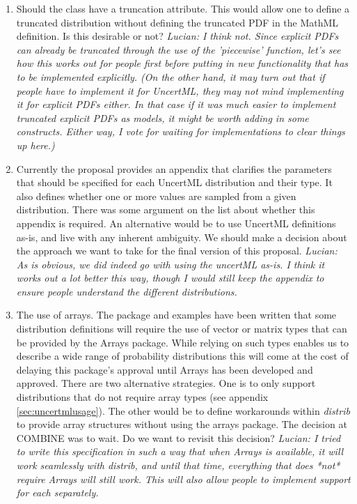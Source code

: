 \documentclass[draftspec]{sbmlpkgspec}
\newcommand{\distribshort}{\emph{distrib}\xspace}
\newcommand{\mathml}{MathML\xspace}
\newcommand{\uncertml}{UncertML\xspace}
\begin{document}
\begin{enumerate}
\item Should the  class have a truncation
  attribute. This would allow one to define a truncated distribution
  without defining the truncated PDF in the \mathml definition. Is
  this desirable or not?
  \emph{Lucian:  I think not.  Since explicit PDFs can already be truncated through the use of the 'piecewise' function, let's see how this works out for people first before putting in new functionality that has to be implemented explicitly.  (On the other hand, it may turn out that if people have to implement it for UncertML, they may not mind implementing it for explicit PDFs either.  In that case if it was much easier to implement truncated explicit PDFs as models, it might be worth adding in some constructs.  Either way, I vote for waiting for implementations to clear things up here.)}

\item Currently the proposal provides an appendix that clarifies the
  parameters that should be specified for each \uncertml distribution and their
  type. It also defines whether one or more values are sampled from a
  given distribution. There was some argument on the list about
  whether this appendix is required. An alternative would be to use
  \uncertml definitions as-is, and live with any inherent
  ambiguity. We should make a decision about the approach we want to
  take for the final version of this proposal.
  \emph{Lucian:  As is obvious, we did indeed go with using the uncertML as-is.  I think it works out a lot better this way, though I would still keep the appendix to ensure people understand the different distributions.}
\item The use of arrays. The package and examples have been written
  that some distribution definitions will require the use of vector or
  matrix types that can be provided by the Arrays package. While
  relying on such types enables us to describe a wide range of
  probability distributions this will come at the cost of delaying
  this package's approval until Arrays has been developed and
  approved. There are two alternative strategies. One is to only
  support distributions that do not require array types (see appendix
  \ref{sec:uncertmlusage}). The other would be to define workarounds
  within \distribshort to provide array structures without using the
  arrays package. The decision at COMBINE was to wait. Do we want to
  revisit this decision?
  \emph{Lucian:  I tried to write this specification in such a way that when Arrays is available, it will work seamlessly with distrib, and until that time, everything that does *not* require Arrays will still work.  This will also allow people to implement support for each separately.}


\end{enumerate}
\end{document}

